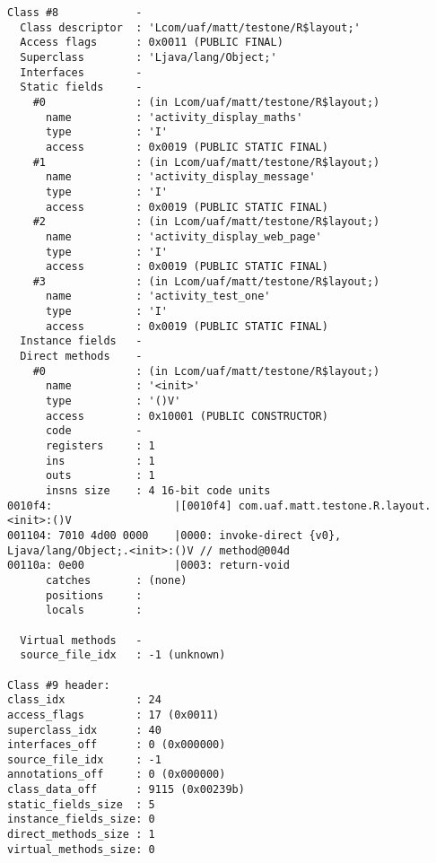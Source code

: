 \begin{lstlisting}
Class #8            -
  Class descriptor  : 'Lcom/uaf/matt/testone/R$layout;'
  Access flags      : 0x0011 (PUBLIC FINAL)
  Superclass        : 'Ljava/lang/Object;'
  Interfaces        -
  Static fields     -
    #0              : (in Lcom/uaf/matt/testone/R$layout;)
      name          : 'activity_display_maths'
      type          : 'I'
      access        : 0x0019 (PUBLIC STATIC FINAL)
    #1              : (in Lcom/uaf/matt/testone/R$layout;)
      name          : 'activity_display_message'
      type          : 'I'
      access        : 0x0019 (PUBLIC STATIC FINAL)
    #2              : (in Lcom/uaf/matt/testone/R$layout;)
      name          : 'activity_display_web_page'
      type          : 'I'
      access        : 0x0019 (PUBLIC STATIC FINAL)
    #3              : (in Lcom/uaf/matt/testone/R$layout;)
      name          : 'activity_test_one'
      type          : 'I'
      access        : 0x0019 (PUBLIC STATIC FINAL)
  Instance fields   -
  Direct methods    -
    #0              : (in Lcom/uaf/matt/testone/R$layout;)
      name          : '<init>'
      type          : '()V'
      access        : 0x10001 (PUBLIC CONSTRUCTOR)
      code          -
      registers     : 1
      ins           : 1
      outs          : 1
      insns size    : 4 16-bit code units
0010f4:                   |[0010f4] com.uaf.matt.testone.R.layout.<init>:()V
001104: 7010 4d00 0000    |0000: invoke-direct {v0}, Ljava/lang/Object;.<init>:()V // method@004d
00110a: 0e00              |0003: return-void
      catches       : (none)
      positions     :
      locals        :

  Virtual methods   -
  source_file_idx   : -1 (unknown)

Class #9 header:
class_idx           : 24
access_flags        : 17 (0x0011)
superclass_idx      : 40
interfaces_off      : 0 (0x000000)
source_file_idx     : -1
annotations_off     : 0 (0x000000)
class_data_off      : 9115 (0x00239b)
static_fields_size  : 5
instance_fields_size: 0
direct_methods_size : 1
virtual_methods_size: 0


\end{lstlisting}
